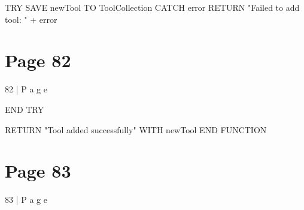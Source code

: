 \documentclass{article}
\begin{document}
    TRY 
        SAVE newTool TO ToolCollection 
    CATCH error 
        RETURN "Failed to add tool: " + error 

\section*{Page 82}
82 | P a g e 
 
    END TRY 
  
    RETURN "Tool added successfully" WITH newTool 
END FUNCTION 
 
 
 
 
 
 


\section*{Page 83}
83 | P a g e 
 
 
 
 
 
\end{document}
